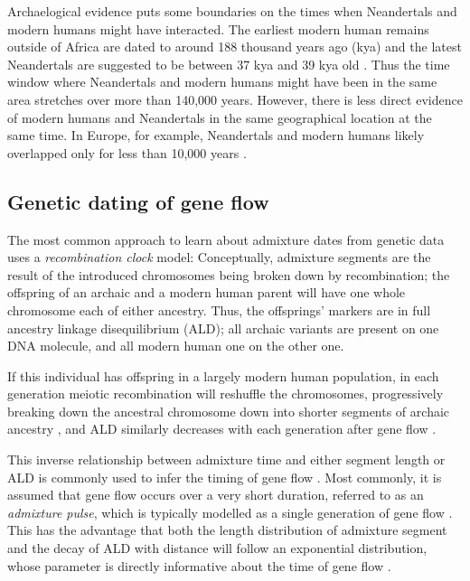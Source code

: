 \documentclass[11pt]{article}
\begin{document}
 
Archaelogical evidence puts some boundaries on the times when Neandertals and modern humans might have interacted. The earliest modern human remains outside of Africa are dated to around 188 thousand years ago (kya)  \citep{hershkovitz_earliest_2018,stringer_when_2018} and the latest Neandertals are suggested to be between 37 kya and 39 kya old \citep{higham_timing_2014,zilhao_precise_2017}. Thus the time window where Neandertals and modern humans might have been in the same area stretches over more than 140,000 years. However, there is less direct evidence of modern humans and Neandertals in the same geographical location at the same time. In Europe, for example, Neandertals and modern humans likely overlapped only for less than 10,000 years \citep{bard_extended_2020}. 

\subsection{Genetic dating of gene flow}\label{Admixture models}

The most common approach to learn about admixture dates from genetic data uses a \emph{recombination clock} model: Conceptually, admixture segments are the result of the introduced chromosomes being broken down by recombination; the offspring of an archaic and a modern human parent will have one whole chromosome each of either ancestry. Thus, the offsprings' markers are in full ancestry linkage disequilibrium (ALD); all archaic variants are present on one DNA molecule, and all modern human one on the other one.

If this individual has offspring in a largely modern human population, in each generation meiotic recombination will reshuffle the chromosomes, progressively breaking down the ancestral chromosome down into shorter segments of archaic ancestry \citep{falush_inference_2003, gravel_population_2012,liang_lengths_2014}, and ALD similarly decreases with each generation after gene flow \citep{chakraborty_admixture_1988,stephens_mapping_1994,wall_detecting_2000}.


This inverse relationship between admixture time and either segment length or ALD is commonly used to infer the timing of gene flow \citep{pool_inference_2009,moorjani_history_2011,pugach_dating_2011,gravel_population_2012,sankararaman_date_2012,loh_inferring_2013,hellenthal_genetic_2014,liang_lengths_2014,sankararaman_combined_2016,pugach_gateway_2018,jacobs_multiple_2019}. Most commonly, it is assumed that gene flow occurs over a very short duration, referred to as an \textit{admixture pulse}, which is typically modelled as a single generation of gene flow \citep[e.g][]{moorjani_history_2011}. This has the advantage that both the length distribution of admixture segment and the decay of ALD with distance will follow an exponential distribution, whose parameter is directly informative about the time of gene flow \citep{pool_inference_2009, liang_lengths_2014, gravel_population_2012}.
\end{document}
